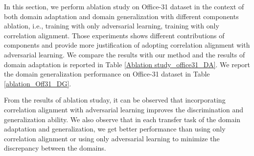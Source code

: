\documentclass[review]{elsarticle}
\begin{document}
\begin{table}[!htbp]
\fontsize{5}{6}\selectfont 
\begin{center}
\end{center}
\caption{Ablation study on Office-31 dataset in the context of domain generalization.}
\label{ablation_Off31_DG}
\end{table}


In this section, we perform ablation study on Office-31 dataset in the context of both domain adaptation and domain generalization with different components ablation, i.e., training with only adversarial learning, training with only correlation alignment. Those experiments shows different contributions of components and provide more justification of adopting correlation alignment with adversarial learning. We compare the results with our method and the results of domain adaptation is reported in Table \ref{Ablation study_office31_DA}. We report the domain generalization performance on Office-31 dataset in Table \ref{ablation_Off31_DG}. 

From the results of ablation studay, it can be observed that incorporating correlation alignment with adversarial learning improves the discrimination and generalization ability. We also observe that in each transfer task of the domain adaptation and generalization, we get better performance than using only correlation alignment or using only adversarial learning to minimize the discrepancy between the domains.
\end{document}
